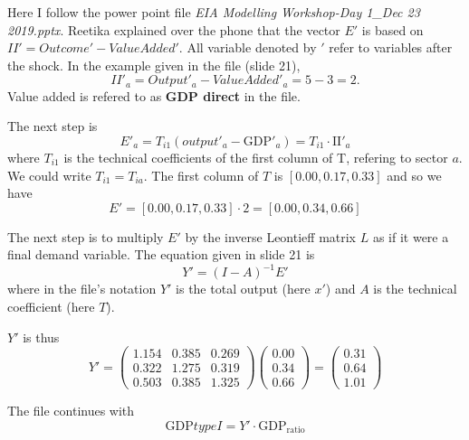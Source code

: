\documentclass[12pt]{article}
\begin{document}
Here I follow the power point file \textit{EIA Modelling Workshop-Day 1\_Dec 23 2019.pptx}. 
Reetika explained over the phone that the vector $E'$ is based on $II' = Outcome' - Value Added'$. 
All variable denoted by $'$ refer to variables after the shock. 
In the example given in the file (slide 21), 
\begin{equation}
II'_a = Output'_a - Value Added'_a = 5-3 = 2. 
\end{equation}
Value added is refered to as \textbf{GDP direct} in the file.

The next step is
\begin{equation}
E'_a = T_{i1}(output'_a - \text{GDP}'_a)  = T_{i1} \cdot \text{II}'_a
\end{equation}
where $T_{i1}$ is the technical coefficients of the first column of T, refering to sector $a$.
We could write $T_{i1} = T_{ia}$.
The first column of $T$ is $[0.00, 0.17, 0.33]$ and so we have
\begin{equation}
E' = [0.00, 0.17, 0.33] \cdot 2 = [0.00, 0.34, 0.66]
\end{equation}

The next step is to multiply $E'$ by the inverse Leontieff matrix $L$ as if it were a final demand variable. The equation given in slide 21 is
\begin{equation}
Y' = (I-A)^{-1} E'
\end{equation}
where in the file's notation $Y'$ is the total output (here $x'$) and $A$ is the technical coefficient (here $T$).

$Y'$ is thus
\begin{equation}
Y' = \begin{pmatrix}
1.154 & 0.385 & 0.269 \\
0.322 & 1.275 & 0.319 \\
0.503 & 0.385 & 1.325
\end{pmatrix}
\begin{pmatrix}
0.00 \\
0.34 \\
0.66
\end{pmatrix}
=
\begin{pmatrix}
0.31 \\
0.64 \\
1.01
\end{pmatrix}
\end{equation}

The file continues with
\begin{equation}\label{eq:typeI_Reetika}
\text{GDP} type I = Y'  \cdot \text{GDP}_{\text{ratio}}
\end{equation}
\end{document}
